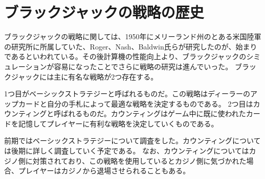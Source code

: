 
\section{ブラックジャックの戦略の歴史}
ブラックジャックの戦略に関しては、1950年にメリーランド州のとある米国陸軍の研究所に所属していた、Roger、Nash、Baldwin氏らが研究したのが、始まりであるといわれている。その後計算機の性能向上より、ブラックジャックのシミュレーションが容易になったことでさらに戦略の研究は進んでいった。
ブラックジャックには主に有名な戦略が2つ存在する。

1つ目がベーシックストラテジーと呼ばれるものだ。この戦略はディーラーのアップカードと自分の手札によって最適な戦略を決定するものである。
2つ目はカウンティングと呼ばれるものだ。カウンティングはゲーム中に既に使われたカードを記憶してプレイヤーに有利な戦略を決定していくものである。

前期ではベーシックストラテジーについて調査をした。カウンティングについては後期に詳しく調査していく予定である。
なお、カウンティングについてはカジノ側に対策されており、この戦略を使用しているとカジノ側に気づかれた場合、プレイヤーはカジノから退場させられることもある。

